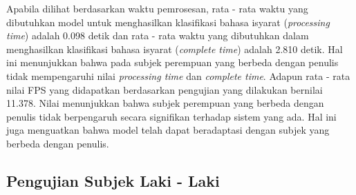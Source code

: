 Apabila dilihat berdasarkan waktu pemrosesan, rata - rata waktu yang dibutuhkan model untuk menghasilkan klasifikasi bahasa isyarat (\emph{processing time}) adalah 0.098 detik dan rata - rata waktu yang dibutuhkan dalam menghasilkan klasifikasi bahasa isyarat (\emph{complete time}) adalah 2.810 detik. Hal ini menunjukkan bahwa pada subjek perempuan yang berbeda dengan penulis tidak mempengaruhi nilai \emph{processing time} dan \emph{complete time}. Adapun rata - rata nilai FPS yang didapatkan berdasarkan pengujian yang dilakukan bernilai 11.378. Nilai menunjukkan bahwa subjek perempuan yang berbeda dengan penulis tidak berpengaruh secara signifikan terhadap sistem yang ada. Hal ini juga menguatkan bahwa model telah dapat beradaptasi dengan subjek yang berbeda dengan penulis.

\subsection{Pengujian Subjek Laki - Laki}
\label{sec:analisislaki}


